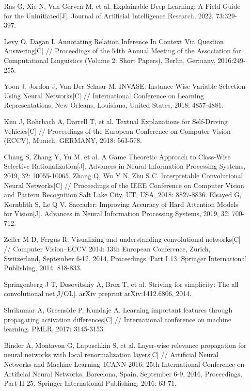 \begin{thebibliography}{200}
Ras G, Xie N, Van Gerven M, et al. Explainable Deep Learning: A Field Guide for the Uninitiated[J]. Journal of Artificial Intelligence Research, 2022, 73:329-397.

Levy O, Dagan I. Annotating Relation Inference In Context Via Question Answering[C] // Proceedings of the 54th Annual Meeting of the Association for Computational Linguistics (Volume 2: Short Papers), Berlin, Germany, 2016:249-255.

Yoon J, Jordon J, Van Der Schaar M. INVASE: Instance-Wise Variable Selection Using Neural Networks[C] // International Conference on Learning Representations, New Orleans, Louisiana, United States, 2018: 4857-4881.

Kim J, Rohrbach A, Darrell T, et al. Textual Explanations for Self-Driving Vehicles[C] // Proceedings of the European Conference on Computer Vision (ECCV), Munich, GERMANY, 2018: 563-578.

Chang S, Zhang Y, Yu M, et al. A Game Theoretic Approach to Class-Wise Selective Rationalization[J]. Advances in Neural Information Processing Systems, 2019, 32: 10055-10065.
Zhang Q, Wu Y N, Zhu S C. Interpretable Convolutional Neural Networks[C] // Proceedings of the IEEE Conference on Computer Vision and Pattern Recognition Salt Lake City, UT, USA, 2018: 8827-8836.
Elsayed G, Kornblith S, Le Q V. Saccader: Improving Accuracy of Hard Attention Models for Vision[J]. Advances in Neural Information Processing Systems, 2019, 32: 700-712.

Zeiler M D, Fergus R. Visualizing and understanding convolutional networks[C] // Computer Vision–ECCV 2014: 13th European Conference, Zurich, Switzerland, September 6-12, 2014, Proceedings, Part I 13. Springer International Publishing, 2014: 818-833.

Springenberg J T, Dosovitskiy A, Brox T, et al. Striving for simplicity: The all convolutional net[J/OL]. arXiv preprint arXiv:1412.6806, 2014.

Shrikumar A, Greenside P, Kundaje A. Learning important features through propagating activation differences[C] // International conference on machine learning. PMLR, 2017: 3145-3153.

Binder A, Montavon G, Lapuschkin S, et al. Layer-wise relevance propagation for neural networks with local renormalization layers[C] // Artificial Neural Networks and Machine Learning–ICANN 2016: 25th International Conference on Artificial Neural Networks, Barcelona, Spain, September 6-9, 2016, Proceedings, Part II 25. Springer International Publishing, 2016: 63-71.


\end{thebibliography}
